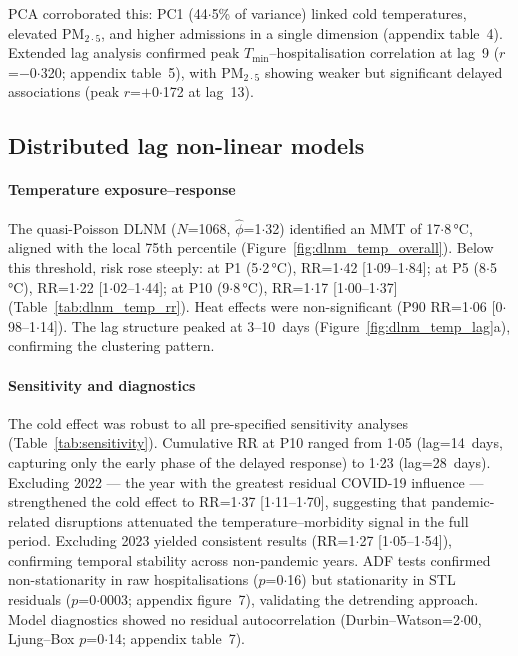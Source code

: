 \documentclass[review,number]{elsarticle}
\begin{document}
PCA corroborated this: PC1 (44${\cdot}$5\% of variance) linked cold
temperatures, elevated $\text{PM}_{2{\cdot}5}$, and higher admissions in a
single dimension (appendix table~4). Extended lag analysis confirmed peak
$T_\mathrm{min}$--hospitalisation correlation at lag~9
($r$=$-$0${\cdot}$320; appendix table~5), with $\text{PM}_{2{\cdot}5}$ showing
weaker but significant delayed associations (peak $r$=$+$0${\cdot}$172
at lag~13).

\subsection{Distributed lag non-linear models}
\label{sec:dlnm_results}

\paragraph{Temperature exposure--response}
The quasi-Poisson DLNM ($N$=1068, $\hat{\phi}$=1${\cdot}$32)
identified an MMT of 17${\cdot}$8\,°C, aligned with the local 75th
percentile (Figure~\ref{fig:dlnm_temp_overall}). Below this threshold,
risk rose steeply: at P1 (5${\cdot}$2\,°C), RR=1${\cdot}$42
[1${\cdot}$09--1${\cdot}$84]; at P5 (8${\cdot}$5\,°C),
RR=1${\cdot}$22 [1${\cdot}$02--1${\cdot}$44]; at P10
(9${\cdot}$8\,°C), RR=1${\cdot}$17 [1${\cdot}$00--1${\cdot}$37]
(Table~\ref{tab:dlnm_temp_rr}). Heat effects were non-significant
(P90 RR=1${\cdot}$06 [0${\cdot}$98--1${\cdot}$14]). The lag
structure peaked at 3--10~days (Figure~\ref{fig:dlnm_temp_lag}a),
confirming the clustering pattern.

\paragraph{Sensitivity and diagnostics}
The cold effect was robust to all pre-specified sensitivity analyses
(Table~\ref{tab:sensitivity}). Cumulative RR at P10 ranged from
1${\cdot}$05 (lag=14~days, capturing only the early phase of the
delayed response) to 1${\cdot}$23 (lag=28~days). Excluding
2022 --- the year with the greatest residual COVID-19 influence ---
strengthened the cold effect to RR=1${\cdot}$37
[1${\cdot}$11--1${\cdot}$70], suggesting that pandemic-related
disruptions attenuated the temperature--morbidity signal in the full
period. Excluding 2023 yielded consistent results (RR=1${\cdot}$27
[1${\cdot}$05--1${\cdot}$54]), confirming temporal stability across
non-pandemic years. ADF tests confirmed non-stationarity in raw hospitalisations
($p$=0${\cdot}$16) but stationarity in STL residuals
($p$=0${\cdot}$0003; appendix figure~7), validating the detrending approach.
Model diagnostics showed no residual autocorrelation
(Durbin--Watson=2${\cdot}$00, Ljung--Box $p$=0${\cdot}$14;
appendix table~7).
\end{document}
